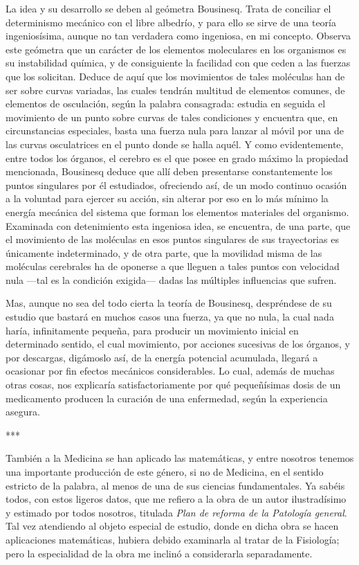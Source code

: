 \documentclass[a4paper, 12pt]{article}
\begin{document}
La idea y su desarrollo se deben al geómetra Bousinesq. Trata de conciliar el determinismo mecánico con el libre albedrío, y para ello se sirve de una teoría ingeniosísima, aunque no tan verdadera como ingeniosa, en mi concepto. Observa este geómetra que un carácter de los elementos moleculares en los organismos es su instabilidad química, y de consiguiente la facilidad con que ceden a las fuerzas que los solicitan. Deduce de aquí que los movimientos de tales moléculas han de ser sobre curvas variadas, las cuales tendrán multitud de elementos comunes, de elementos de osculación, según la palabra consagrada: estudia en seguida el movimiento de un punto sobre curvas de tales condiciones y encuentra que, en circunstancias especiales, basta una fuerza nula para lanzar al móvil por una de las curvas osculatrices en el punto donde se halla aquél. Y como evidentemente, entre todos los órganos, el cerebro es el que posee en grado máximo la propiedad mencionada, Bousinesq deduce que allí deben presentarse constantemente los puntos singulares por él estudiados, ofreciendo así, de un modo continuo ocasión a la voluntad para ejercer su acción, sin alterar por eso en lo más mínimo la energía mecánica del sistema que forman los elementos materiales del organismo. Examinada con detenimiento esta ingeniosa idea, se encuentra, de una parte, que el movimiento de las moléculas en esos puntos singulares de sus trayectorias es únicamente indeterminado, y de otra parte, que la movilidad misma de las moléculas cerebrales ha de oponerse a que lleguen a tales puntos con velocidad nula ---tal es la condición exigida--- dadas las múltiples influencias que sufren.





Mas, aunque no sea del todo cierta la teoría de Bousinesq, despréndese de su estudio que bastará en muchos casos una fuerza, ya que no nula, la cual nada haría, infinitamente pequeña, para producir un movimiento inicial en determinado sentido, el cual movimiento, por acciones sucesivas de los órganos, y por descargas, digámoslo así, de la energía potencial acumulada, llegará a ocasionar por fin efectos mecánicos considerables. Lo cual, además de muchas otras cosas, nos explicaría satisfactoriamente por qué pequeñísimas dosis de un medicamento producen la curación de una enfermedad, según la experiencia asegura.

\bigskip

\centerline{***}

También a la Medicina se han aplicado las matemáticas, y entre nosotros tenemos una importante producción de este género, si no de Medicina, en el sentido estricto de la palabra, al menos de una de sus ciencias fundamentales. Ya sabéis todos, con estos ligeros datos, que me refiero a la obra de un autor ilustradísimo y estimado por todos nosotros, titulada {\it Plan de reforma de la Patología general}. Tal vez atendiendo al objeto especial de estudio, donde en dicha obra se hacen aplicaciones matemáticas, hubiera debido examinarla al tratar de la Fisiología; pero la especialidad de la obra me inclinó a considerarla separadamente.
\end{document}
